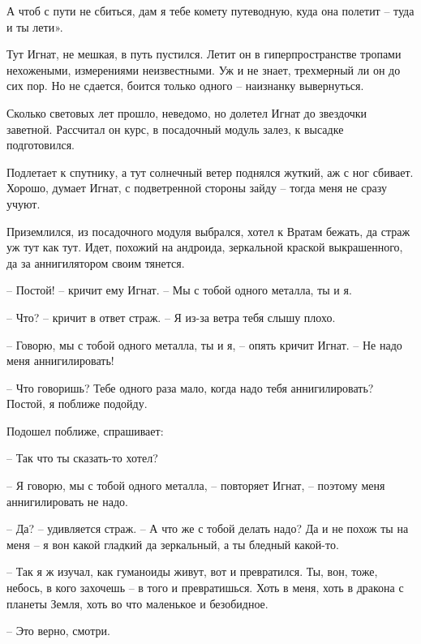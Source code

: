 \documentclass[ebook,oneside,final,openright]{memoir}
\begin{document}
А чтоб с пути не сбиться, дам я тебе комету путеводную, куда она полетит – туда и ты лети».\par
\par
Тут Игнат, не мешкая, в путь пустился. Летит он в гиперпространстве тропами нехожеными, измерениями неизвестными. Уж и не знает, трехмерный ли он до сих пор. Но не сдается, боится только одного – наизнанку вывернуться.\par
\par
Сколько световых лет прошло, неведомо, но долетел Игнат до звездочки заветной. Рассчитал он курс, в посадочный модуль залез, к высадке подготовился.\par
\par
Подлетает к спутнику, а тут солнечный ветер поднялся жуткий, аж с ног сбивает. Хорошо, думает Игнат, с подветренной стороны зайду – тогда меня не сразу учуют. \par
\par
 Приземлился, из посадочного модуля выбрался, хотел к Вратам бежать, да страж уж тут как тут. Идет, похожий на андроида, зеркальной краской выкрашенного, да за аннигилятором своим тянется. \par
 \par
– Постой! – кричит ему Игнат. – Мы с тобой одного металла, ты и я. \par
– Что? – кричит в ответ страж. – Я из-за ветра тебя слышу плохо. \par
– Говорю, мы с тобой одного металла, ты и я, – опять кричит Игнат. – Не надо меня аннигилировать!\par
– Что говоришь? Тебе одного раза мало, когда надо тебя аннигилировать? Постой, я поближе подойду. \par
Подошел поближе, спрашивает: \par
– Так что ты сказать-то хотел? \par
– Я говорю, мы с тобой одного металла, – повторяет Игнат, – поэтому меня аннигилировать не надо. \par
– Да? – удивляется страж. – А что же с тобой делать надо? Да и не похож ты на меня – я вон какой гладкий да зеркальный, а ты бледный какой-то. \par
– Так я ж изучал, как гуманоиды живут, вот и превратился. Ты, вон, тоже, небось, в кого захочешь – в того и превратишься. Хоть в меня, хоть в дракона с планеты Земля, хоть во что маленькое и безобидное. \par
– Это верно, смотри. \par
\par
\end{document}
